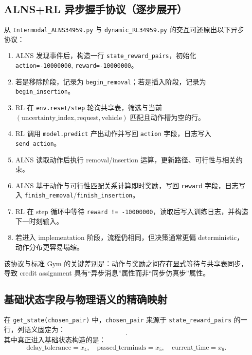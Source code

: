 ﻿\documentclass[11pt,a4paper]{ctexart}
\begin{document}
\subsection{ALNS+RL 异步握手协议（逐步展开）}
从 \texttt{Intermodal\_ALNS34959.py} 与 \texttt{dynamic\_RL34959.py} 的交互可还原出以下异步协议：
\begin{enumerate}[leftmargin=*]
  \item ALNS 发现事件后，构造一行 \texttt{state\_reward\_pairs}，初始化
  \texttt{action=-10000000}, \texttt{reward=-10000000}。
  \item 若是移除阶段，记录为 \texttt{begin\_removal}；若是插入阶段，记录为 \texttt{begin\_insertion}。
  \item RL 在 \texttt{env.reset/step} 轮询共享表，筛选与当前 \((\text{uncertainty\_index},\text{request},\text{vehicle})\)
  匹配且动作槽为空的行。
  \item RL 调用 \texttt{model.predict} 产出动作并写回 \texttt{action} 字段，日志写入 \texttt{send\_action}。
  \item ALNS 读取动作后执行 removal/insertion 运算，更新路径、可行性与相关约束。
  \item ALNS 基于动作与可行性匹配关系计算即时奖励，写回 \texttt{reward} 字段，日志写入
  \texttt{finish\_removal}/\texttt{finish\_insertion}。
  \item RL 在 step 循环中等待 \texttt{reward != -10000000}，读取后写入训练日志，并构造下一时刻输入。
  \item 若进入 implementation 阶段，流程仍相同，但决策通常更偏 deterministic，动作分布更容易塌缩。
\end{enumerate}

该协议与标准 Gym 的关键差别是：动作与奖励之间存在显式等待与共享表同步，导致 credit assignment 具有“异步消息”属性而非“同步仿真步”属性。

\subsection{基础状态字段与物理语义的精确映射}
在 \texttt{get\_state(chosen\_pair)} 中，\texttt{chosen\_pair} 来源于
\texttt{state\_reward\_pairs} 的一行，列语义固定为：
\begin{equation}
[\text{uncertainty\_index},\text{uncertainty\_type},\text{request},\text{vehicle},
\text{delay\_tolerance},\text{passed\_terminals},\text{current\_time},\text{action},\text{reward}].
\end{equation}
其中真正进入基础状态构造的是：
\begin{equation}
\text{delay\_tolerance}=x_4,\quad
\text{passed\_terminals}=x_5,\quad
\text{current\_time}=x_6.
\end{equation}
\end{document}
